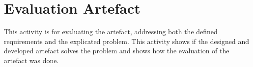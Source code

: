 \chapter{Evaluation Artefact}
This activity is for evaluating the artefact, addressing both the defined requirements and the explicated problem. This activity shows if the designed and developed artefact solves the problem and shows how the evaluation of the artefact was done. 

%
%


